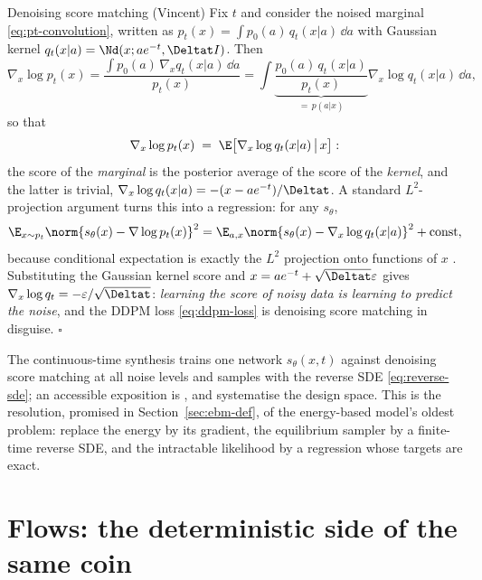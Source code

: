 \begin{toolbox}{Denoising score matching (Vincent)}
Fix $t$ and consider the noised marginal \eqref{eq:pt-convolution},
written as $p_t(x) = \int p_0(a)\, q_t(x|a)\,\dd a$ with Gaussian kernel
$q_t(x|a) = \Nd(x; a e^{-t}, \Deltat I)$. Then
\begin{equation*}
  \nabla_x \log p_t(x)
  = \frac{\int p_0(a)\, \nabla_x q_t(x|a)\, \dd a}{p_t(x)}
  = \int \underbrace{\frac{p_0(a)\, q_t(x|a)}{p_t(x)}}_{=\,p(a|x)}
    \nabla_x \log q_t(x|a)\, \dd a ,
\end{equation*}
so that
\begin{equation*}
  \nabla_x \log p_t(x)
  \;=\; \E\big[ \nabla_x \log q_t(x|a) \,\big|\, x \big] :
\end{equation*}
the score of the \emph{marginal} is the posterior average of the score of
the \emph{kernel}, and the latter is trivial,
$\nabla_x \log q_t(x|a) = -(x - a e^{-t})/\Deltat$. A standard
$L^2$-projection argument turns this into a regression: for any
$s_\theta$,
\begin{equation*}
  \E_{x \sim p_t} \norm{ s_\theta(x) - \nabla \log p_t(x) }^2
  = \E_{a, x} \norm{ s_\theta(x) - \nabla_x \log q_t(x|a) }^2
  + \text{const},
\end{equation*}
because conditional expectation is exactly the $L^2$ projection onto
functions of $x$ \citep{vincent2011connection}. Substituting the Gaussian
kernel score and $x = a e^{-t} + \sqrt{\Deltat}\varepsilon$ gives
$\nabla_x \log q_t = -\varepsilon / \sqrt{\Deltat}$: \emph{learning the
score of noisy data is learning to predict the noise}, and the DDPM loss
\eqref{eq:ddpm-loss} is denoising score matching in disguise.
\hfill$\square$
\end{toolbox}

The continuous-time synthesis \citep{song2019generative,
song2021scorebased} trains one network $s_\theta(x, t)$ against denoising
score matching at all noise levels and samples with the reverse SDE
\eqref{eq:reverse-sde}; an accessible exposition is \citet{song2021blog},
and \citet{karras2022elucidating} systematise the design space. This is
the resolution, promised in Section~\ref{sec:ebm-def}, of the
energy-based model's oldest problem: \citeauthor{song2019generative}
replace the energy by its gradient, the equilibrium sampler by a
finite-time reverse SDE, and the intractable likelihood by a regression
whose targets are exact.

\section{Flows: the deterministic side of the same coin}\label{sec:flows}

